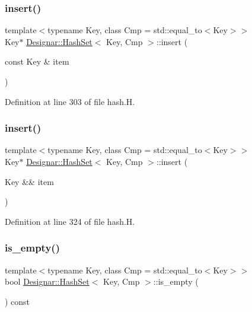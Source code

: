 \subsubsection{\texorpdfstring{insert()}{insert()}\hspace{0.1cm}{\footnotesize\ttfamily [1/2]}}
{\footnotesize\ttfamily template$<$typename Key, class Cmp = std\+::equal\+\_\+to$<$\+Key$>$$>$ \\
Key$\ast$ \hyperlink{class_designar_1_1_hash_set}{Designar\+::\+Hash\+Set}$<$ Key, Cmp $>$\+::insert (\begin{DoxyParamCaption}\item[{const Key \&}]{item }\end{DoxyParamCaption})\hspace{0.3cm}{\ttfamily [inline]}}



Definition at line 303 of file hash.\+H.

\mbox{\label{class_designar_1_1_hash_set_ac18e38933ad6611da769ad878062cfb4}} 
\subsubsection{\texorpdfstring{insert()}{insert()}\hspace{0.1cm}{\footnotesize\ttfamily [2/2]}}
{\footnotesize\ttfamily template$<$typename Key, class Cmp = std\+::equal\+\_\+to$<$\+Key$>$$>$ \\
Key$\ast$ \hyperlink{class_designar_1_1_hash_set}{Designar\+::\+Hash\+Set}$<$ Key, Cmp $>$\+::insert (\begin{DoxyParamCaption}\item[{Key \&\&}]{item }\end{DoxyParamCaption})\hspace{0.3cm}{\ttfamily [inline]}}



Definition at line 324 of file hash.\+H.

\mbox{\label{class_designar_1_1_hash_set_a2da1b699af1bf81e0965a35c4c4b3e35}} 
\subsubsection{\texorpdfstring{is\+\_\+empty()}{is\_empty()}}
{\footnotesize\ttfamily template$<$typename Key, class Cmp = std\+::equal\+\_\+to$<$\+Key$>$$>$ \\
bool \hyperlink{class_designar_1_1_hash_set}{Designar\+::\+Hash\+Set}$<$ Key, Cmp $>$\+::is\+\_\+empty (\begin{DoxyParamCaption}{ }\end{DoxyParamCaption}) const\hspace{0.3cm}{\ttfamily [inline]}}



